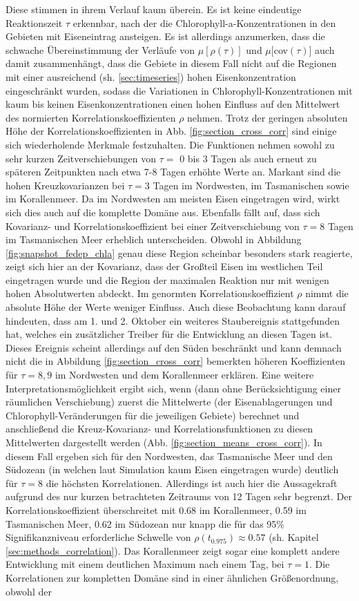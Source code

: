 \documentclass[12pt,a4paper,onecolumn,headheight=30pt]{scrartcl}
\begin{document}
Diese stimmen in ihrem Verlauf kaum überein. Es ist keine eindeutige Reaktionszeit $\tau$ erkennbar, nach der die Chlorophyll-a-Konzentrationen in den Gebieten mit Eiseneintrag ansteigen. Es ist allerdings anzumerken, dass die schwache Übereinstimmung der Verläufe von $\mu[\rho(\tau)]$ und $\mu[$cov$(\tau)]$ auch damit zusammenhängt, dass die Gebiete in diesem Fall nicht auf die Regionen mit einer ausreichend (sh. \ref{sec:timeseries}) hohen Eisenkonzentration eingeschränkt wurden, sodass die Variationen in Chlorophyll-Konzentrationen mit kaum bis keinen Eisenkonzentrationen einen hohen Einfluss auf den Mittelwert des normierten Korrelationskoeffizienten $\rho$ nehmen. Trotz der geringen absoluten Höhe der Korrelationskoeffizienten in Abb. \ref{fig:section_cross_corr} sind einige sich wiederholende Merkmale festzuhalten. Die Funktionen nehmen sowohl zu sehr kurzen Zeitverschiebungen von $\tau=$ 0 bis 3 Tagen als auch erneut zu späteren Zeitpunkten nach etwa 7-8 Tagen erhöhte Werte an. Markant sind die hohen Kreuzkovarianzen bei $\tau=3$ Tagen im Nordwesten, im Tasmanischen sowie im Korallenmeer. Da im Nordwesten am meisten Eisen eingetragen wird, wirkt sich dies auch auf die komplette Domäne aus. Ebenfalls fällt auf, dass sich Kovarianz- und Korrelationskoeffizient bei einer Zeitverschiebung von $\tau=8$ Tagen im Tasmanischen Meer erheblich unterscheiden. Obwohl in Abbildung \ref{fig:snapshot_fedep_chla} genau diese Region scheinbar besonders stark reagierte, zeigt sich hier an der Kovarianz, dass der Großteil Eisen im westlichen Teil eingetragen wurde und die Region der maximalen Reaktion nur mit wenigen hohen Absolutwerten abdeckt. Im genormten Korrelationskoeffizient $\rho$ nimmt die absolute Höhe der Werte weniger Einfluss. Auch diese Beobachtung kann darauf hindeuten, dass am 1. und 2. Oktober ein weiteres Staubereignis stattgefunden hat, welches ein zusätzlicher Treiber für die Entwicklung an diesen Tagen ist. Dieses Ereignis scheint allerdings auf den Süden beschränkt und kann demnach nicht die in Abbildung \ref{fig:section_cross_corr} bemerkten höheren Koeffizienten für $\tau=8,9$ im Nordwesten und dem Korallenmeer erklären. Eine weitere Interpretationsmöglichkeit ergibt sich, wenn (dann ohne Berücksichtigung einer räumlichen Verschiebung) zuerst die Mittelwerte (der Eisenablagerungen und Chlorophyll-Veränderungen für die jeweiligen Gebiete) berechnet und anschließend die Kreuz-Kovarianz- und Korrelationsfunktionen zu diesen Mittelwerten dargestellt werden (Abb. \ref{fig:section_means_cross_corr}). In diesem Fall ergeben sich für den Nordwesten, das Tasmanische Meer und den Südozean (in welchen laut Simulation kaum Eisen eingetragen wurde) deutlich für $\tau=8$ die höchsten Korrelationen. Allerdings ist auch hier die Aussagekraft aufgrund des nur kurzen betrachteten Zeitraums von 12 Tagen sehr begrenzt. Der Korrelationskoeffizient überschreitet mit 0.68 im Korallenmeer, 0.59 im Tasmanischen Meer, 0.62 im Südozean nur knapp die für das 95\% Signifikanzniveau erforderliche Schwelle von $\rho(t_{0.975})\approx0.57$ (sh. Kapitel \ref{sec:methods_correlation}). Das Korallenmeer zeigt sogar eine komplett andere Entwicklung mit einem deutlichen Maximum nach einem Tag, bei $\tau=1$. Die Korrelationen zur kompletten Domäne sind in einer ähnlichen Größenordnung, obwohl der 
\end{document}
